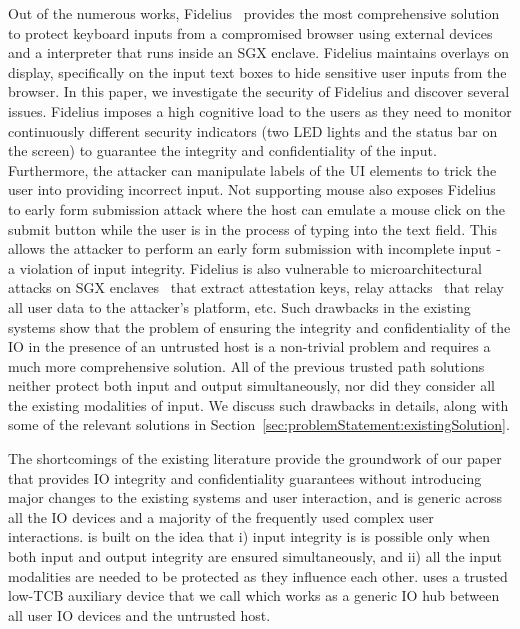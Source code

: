 Out of the numerous works, Fidelius~\cite{Fidelius} provides the most comprehensive solution to protect keyboard inputs from a compromised browser using external devices and a \js interpreter that runs inside an SGX enclave. Fidelius maintains overlays on display, specifically on the input text boxes to hide sensitive user inputs from the browser. In this paper, we investigate the security of Fidelius and discover several issues. Fidelius imposes a high cognitive load to the users as they need to monitor continuously different security indicators (two LED lights and the status bar on the screen) to guarantee the integrity and confidentiality of the input. Furthermore, the attacker can manipulate labels of the UI elements to trick the user into providing incorrect input. Not supporting mouse also exposes Fidelius to early form submission attack where the host can emulate a mouse click on the submit button while the user is in the process of typing into the text field. This allows the attacker to perform an early form submission with incomplete input - a violation of input integrity. Fidelius is also vulnerable to microarchitectural attacks on SGX enclaves~\cite{van2018foreshadow} that extract attestation keys, relay attacks~\cite{dhar2018proximitee} that relay all user data to the attacker's platform, etc. Such drawbacks in the existing systems show that the problem of ensuring the integrity and confidentiality of the IO in the presence of an untrusted host is a non-trivial problem and requires a much more comprehensive solution. All of the previous trusted path solutions neither protect both input and output simultaneously, nor did they consider all the existing modalities of input. We discuss such drawbacks in details, along with some of the relevant solutions in Section~\ref{sec:problemStatement:existingSolution}.

 
 The shortcomings of the existing literature provide the groundwork of our paper \name that provides IO integrity and confidentiality guarantees without introducing major changes to the existing systems and user interaction, and is generic across all the IO devices and a majority of the frequently used complex user interactions. \name is built on the idea that i) input integrity is is possible only when both input and output integrity are ensured simultaneously,
and ii) all the input modalities are needed to be protected as they influence each other. \name uses a trusted low-TCB auxiliary device that we call \device which works as a generic IO hub between all user IO devices and the untrusted host. 

